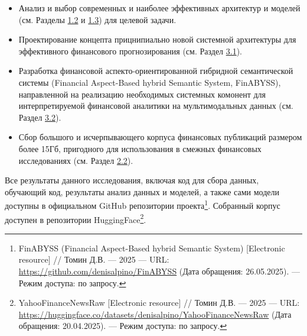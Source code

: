 \begin{itemize}
    \item Анализ и выбор современных и наиболее эффективных архитектур и моделей (см. Разделы \hyperref[sec:ml_algos]{1.2} и
    \hyperref[sec:models]{1.3}) для целевой задачи.
    \item Проектирование концепта прицнипиально новой системной архитектуры для эффективного финансового прогнозирования
    (см. Раздел \hyperref[sec:architecture]{3.1}).
    \item Разработка финансовой аспекто-ориентированной гибридной семантической системы (Financial Aspect-Based hybrid Semantic System, FinABYSS),
    направленной на реализацию необходимых системных комонент для интерпретируемой финансовой аналитики на мультимодальных данных
    (см. Раздел \hyperref[sec:components]{3.2}).
    \item Сбор большого и исчерпывающего корпуса финансовых публикаций размером более 15Гб, пригодного для использования в смежных финансовых исследованиях
    (см. Раздел \hyperref[sec:data_governance]{2.2}).
\end{itemize}

Все результаты данного исследования, включая код для сбора данных, обучающий код, результаты анализ данных и моделей, а также сами модели доступны
в официальном GitHub репозитории проекта\footnote{FinABYSS (Financial Aspect-Based hybrid Semantic System) [Electronic resource] //
Томин Д.В. --- 2025 --- URL: \url{https://github.com/denisalpino/FinABYSS} (Дата обращения: 26.05.2025). --- Режим доступа: по запросу.}.
Собранный корпус доступен в репозитории HuggingFace\footnote{YahooFinanceNewsRaw [Electronic resource] //
Томин Д.В. --- 2025 --- URL: \url{https://huggingface.co/datasets/denisalpino/YahooFinanceNewsRaw} (Дата обращения: 20.04.2025). --- Режим доступа: по запросу.}.